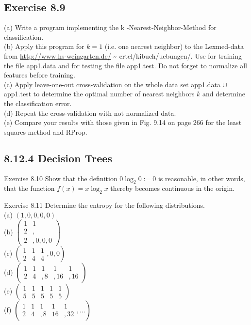 \documentclass[10pt]{book}
\begin{document}
\begin{center}
\begin{enumerate}
\begin{center}
\begin{center}
\begin{center}
\section*{Exercise 8.9}
(a) Write a program implementing the k -Nearest-Neighbor-Method for classification.\\
(b) Apply this program for $k=1$ (i.e. one nearest neighbor) to the Lexmed-data from \href{http://www.hs-weingarten.de/}{http://www.hs-weingarten.de/} \~{} ertel/kibuch/uebungen/. Use for training the file app1.data and for testing the file app1.test. Do not forget to normalize all features before training.\\
(c) Apply leave-one-out cross-validation on the whole data set app1.data $\cup$ app1.test to determine the optimal number of nearest neighbors $k$ and determine the classification error.\\
(d) Repeat the cross-validation with not normalized data.\\
(e) Compare your results with those given in Fig. 9.14 on page 266 for the least squares method and RProp.

\subsection*{8.12.4 Decision Trees}
Exercise 8.10 Show that the definition $0 \log _{2} 0:=0$ is reasonable, in other words, that the function $f(x)=x \log _{2} x$ thereby becomes continuous in the origin.

Exercise 8.11 Determine the entropy for the following distributions.\\
(a) $(1,0,0,0,0)$\\
(b) $\left(\begin{array}{ll}1 & 1 \\ 2 & , \\ 2 & , 0,0,0\end{array}\right)$\\
(c) $\left(\begin{array}{ccc}1 & 1 & 1 \\ 2 & 4 & 4\end{array}, 0,0\right)$\\
(d) $\left(\begin{array}{ccccc}1 & 1 & 1 & 1 & 1 \\ 2 & 4 & , 8 & , 16 & , 16\end{array}\right)$\\
(e) $\left(\begin{array}{ccccc}1 & 1 & 1 & 1 & 1 \\ 5 & 5 & 5 & 5 & 5\end{array}\right)$\\
(f) $\left(\begin{array}{ccccc}1 & 1 & 1 & 1 & 1 \\ 2 & 4 & , 8 & 16 & , 32\end{array}, \ldots\right)$


\end{center}
\end{center}
\end{center}
\end{enumerate}
\end{center}
\end{document}
